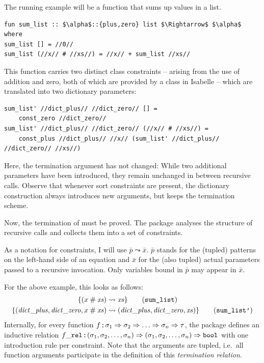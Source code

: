 The running example will be a function that sums up values in a list.
%
\begin{lstlisting}
fun sum_list :: $\alpha$::{plus,zero} list $\Rightarrow$ $\alpha$ where
sum_list [] = //0//
sum_list (//x// # //xs//) = //x// + sum_list //xs//
\end{lstlisting}
%
This function carries two distinct class constraints -- arising from the use of addition and zero, both of which are provided by a class in Isabelle -- which are translated into two dictionary parameters:
%
\begin{lstlisting}[language=Isabelle]
sum_list' //dict_plus// //dict_zero// [] =
    const_zero //dict_zero//
sum_list' //dict_plus// //dict_zero// (//x// # //xs//) =
    const_plus //dict_plus// //x// (sum_list' //dict_plus// //dict_zero// //xs//)
\end{lstlisting}
%
Here, the termination argument has not changed:
While two additional parameters have been introduced, they remain unchanged in between recursive calls.
Observe that whenever sort constraints are present, the dictionary construction always introduces new arguments, but keeps the termination scheme.

Now, the termination of  must be proved.
The  package analyses the structure of recursive calls and collects them into a set of constraints.

As a notation for constraints, I will use $\bar{p} \leadsto \bar{x}$.
$\bar{p}$ stands for the (tupled) patterns on the left-hand side of an equation and $\bar{x}$ for the (also tupled) actual parameters passed to a recursive invocation.
Only variables bound in $\bar{p}$ may appear in $\bar{x}$.


\noindent
For the above example, this looks as follows:
%
\begin{align}
  \{ (x \cons \mathit{xs}) &\leadsto \mathit{xs} \} \tag{\holconst{sum\_list}} \\
  \{ (\mathit{dict\_plus}, \mathit{dict\_zero}, x \cons \mathit{xs}) &\leadsto (\mathit{dict\_plus}, \mathit{dict\_zero}, \mathit{xs})\} \tag{\holconst{sum\_list'}}
\end{align}
%
Internally, for every function $f \mathbin{:\!\!:} \sigma_1 \Rightarrow \sigma_2 \Rightarrow \ldots \Rightarrow \sigma_n \Rightarrow \tau$, the package defines an inductive relation $f\_\texttt{\textup{rel}} \mathbin{:\!\!:} (\sigma_1, \sigma_2, \ldots, \sigma_n) \Rightarrow (\sigma_1, \sigma_2, \ldots, \sigma_n) \Rightarrow \texttt{\textup{bool}}$ with one introduction rule per constraint.
Note that the arguments are tupled, i.e.\ all function arguments participate in the definition of this \emph{termination relation.}

